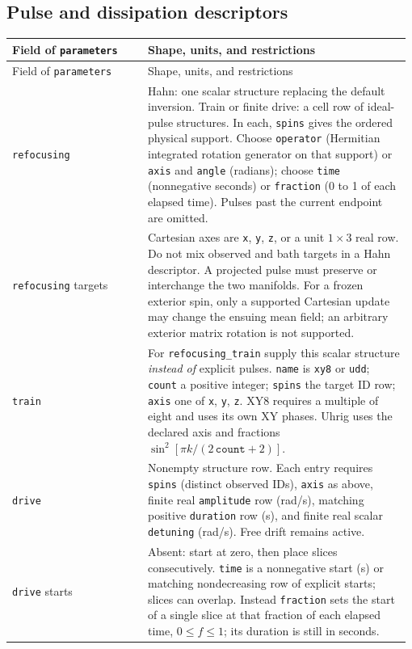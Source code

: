 \documentclass[11pt,a4paper]{article}
\newcommand{\code}[1]{\texttt{#1}}
\begin{document}
\subsection{Pulse and dissipation descriptors}
\begingroup\small
\begin{longtable}{@{}>{\raggedright\arraybackslash}p{0.335\linewidth}@{\hspace{0.025\linewidth}}>{\raggedright\arraybackslash}p{0.64\linewidth}@{}}
\toprule
Field of \code{parameters} & Shape, units, and restrictions\\
\midrule\endfirsthead
\toprule
Field of \code{parameters} & Shape, units, and restrictions\\
\midrule\endhead
\midrule\endfoot
\bottomrule\endlastfoot
\code{refocusing} & Hahn: one scalar structure replacing the default inversion. Train or finite drive: a cell row of ideal-pulse structures. In each, \code{spins} gives the ordered physical support. Choose \code{operator} (Hermitian integrated rotation generator on that support) or \code{axis} and \code{angle} (radians); choose \code{time} (nonnegative seconds) or \code{fraction} (0 to 1 of each elapsed time). Pulses past the current endpoint are omitted.\\
\code{refocusing} targets & Cartesian axes are \code{x}, \code{y}, \code{z}, or a unit $1\times3$ real row. Do not mix observed and bath targets in a Hahn descriptor. A projected pulse must preserve or interchange the two manifolds. For a frozen exterior spin, only a supported Cartesian update may change the ensuing mean field; an arbitrary exterior matrix rotation is not supported.\\
\code{train} & For \code{refocusing\_train} supply this scalar structure \emph{instead of} explicit pulses. \code{name} is \code{xy8} or \code{udd}; \code{count} a positive integer; \code{spins} the target ID row; \code{axis} one of \code{x}, \code{y}, \code{z}. XY8 requires a multiple of eight and uses its own XY phases. Uhrig uses the declared axis and fractions $\sin^2[\pi k/(2\,\code{count}+2)]$.\\
\code{drive} & Nonempty structure row. Each entry requires \code{spins} (distinct observed IDs), \code{axis} as above, finite real \code{amplitude} row (rad/s), matching positive \code{duration} row (s), and finite real scalar \code{detuning} (rad/s). Free drift remains active.\\
\code{drive} starts & Absent: start at zero, then place slices consecutively. \code{time} is a nonnegative start (s) or matching nondecreasing row of explicit starts; slices can overlap. Instead \code{fraction} sets the start of a single slice at that fraction of each elapsed time, $0\le f\le1$; its duration is still in seconds.\\

\end{longtable}
\end{document}
